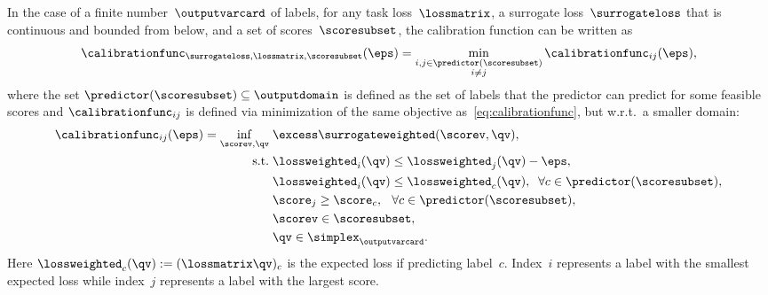 \documentclass{article}
\begin{document}
\begin{lemma}
    \label{th:breakingSymmetries}
    In the case of a finite number~$\outputvarcard$ of labels, for any task loss~$\lossmatrix$, a surrogate loss~$\surrogateloss$ that is continuous and bounded from below, and a set of scores~$\scoresubset$, the calibration function can be written as 
    \begin{equation}
    \label{eq:calibrationfunc:decomposition}
    \calibrationfunc_{\surrogateloss,\lossmatrix,\scoresubset}(\eps) = \min_{\substack{i, j \in \predictor(\scoresubset) \\ i\neq j}} \calibrationfunc_{ij}(\eps),
    \end{equation}
    where the set $\predictor(\scoresubset) \subseteq \outputdomain$ is defined as the set of labels that the predictor can predict for some feasible scores and $\calibrationfunc_{ij}$ is defined via minimization of the same objective as~\eqref{eq:calibrationfunc}, but w.r.t.\ a smaller domain:
    \begin{align}
    \label{eq:calibrationfunc:generalBreakingSymmetries}
    \calibrationfunc_{ij}(\eps)
    =
    \inf_{\scorev, \qv} \;& \excess\surrogateweighted(\scorev, \qv), \\
    \notag %
    \text{s.t.} \;& \lossweighted_i(\qv) \leq\lossweighted_j(\qv) - \eps,\\
    \notag %
    &\lossweighted_i(\qv) \leq \lossweighted_c(\qv),\;\; \forall c \in \predictor(\scoresubset), \\
    \notag %
    &\score_j \geq \score_c,\;\:\: \forall c \in \predictor(\scoresubset), \\
    \notag %
    & \scorev \in \scoresubset,\\
    \notag
    & \qv \in \simplex_\outputvarcard.
    \end{align}
    Here $\lossweighted_c(\qv) := (\lossmatrix \qv)_c$ is the expected loss if predicting label~$c$.
    Index~$i$ represents a label with the smallest expected loss while index~$j$ represents a label with the largest score.
\end{lemma}
\end{document}
